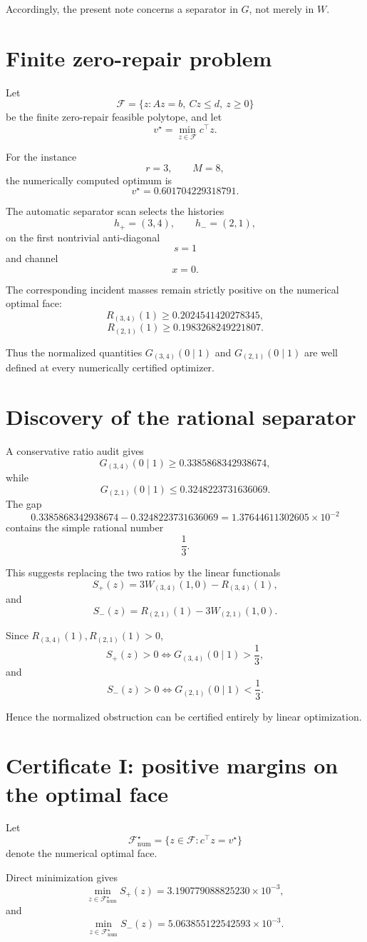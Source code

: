 \documentclass[11pt,a4paper]{article}
\newcommand{\F}{\mathcal F}
\newcommand{\opt}{v^\star}
\newcommand{\Wp}{W_{(3,4)}(1,0)}
\newcommand{\Wm}{W_{(2,1)}(1,0)}
\newcommand{\Rp}{R_{(3,4)}(1)}
\newcommand{\Rm}{R_{(2,1)}(1)}
\newcommand{\Gp}{G_{(3,4)}(0\mid1)}
\newcommand{\Gm}{G_{(2,1)}(0\mid1)}
\begin{document}
Accordingly, the present note concerns a separator in \(G\), not merely in
\(W\).

\section{Finite zero-repair problem}

Let
\[
\F
=
\{z:Az=b,\ Cz\le d,\ z\ge0\}
\]
be the finite zero-repair feasible polytope, and let
\[
\opt
=
\min_{z\in\F} c^\top z.
\]

For the instance
\[
r=3,\qquad M=8,
\]
the numerically computed optimum is
\[
\boxed{
\opt
=
0.601704229318791.
}
\]

The automatic separator scan selects the histories
\[
h_+=(3,4),
\qquad
h_-=(2,1),
\]
on the first nontrivial anti-diagonal
\[
s=1
\]
and channel
\[
x=0.
\]

The corresponding incident masses remain strictly positive on the numerical
optimal face:
\[
\Rp \ge 0.2024541420278345,
\]
\[
\Rm \ge 0.1983268249221807.
\]

Thus the normalized quantities \(\Gp\) and \(\Gm\) are well defined at every
numerically certified optimizer.

\section{Discovery of the rational separator}

A conservative ratio audit gives
\[
\Gp
\ge
0.3385868342938674,
\]
while
\[
\Gm
\le
0.3248223731636069.
\]
The gap
\[
0.3385868342938674
-
0.3248223731636069
=
1.37644611302605\times10^{-2}
\]
contains the simple rational number
\[
\boxed{\frac13}.
\]

This suggests replacing the two ratios by the linear functionals
\[
S_+(z)
=
3\Wp-\Rp,
\]
and
\[
S_-(z)
=
\Rm-3\Wm.
\]

Since \(\Rp,\Rm>0\),
\[
S_+(z)>0
\iff
\Gp>\frac13,
\]
and
\[
S_-(z)>0
\iff
\Gm<\frac13.
\]

Hence the normalized obstruction can be certified entirely by linear
optimization.

\section{Certificate I: positive margins on the optimal face}

Let
\[
\F^\star_{\mathrm{num}}
=
\{z\in\F:c^\top z=\opt\}
\]
denote the numerical optimal face.

Direct minimization gives
\[
\boxed{
\min_{z\in\F^\star_{\mathrm{num}}}
S_+(z)
=
3.190779088825230\times10^{-3},
}
\]
and
\[
\boxed{
\min_{z\in\F^\star_{\mathrm{num}}}
S_-(z)
=
5.063855122542593\times10^{-3}.
}
\]
\end{document}
